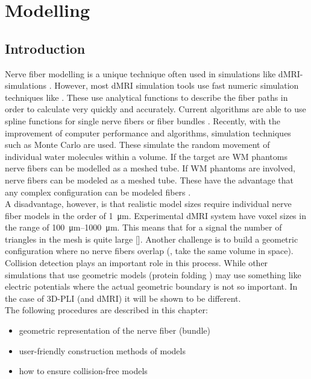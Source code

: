 \setcounter{chapter}{4}
\chapter{Modelling}
\label{chap:modelling}
% 
% 
\section{Introduction}
% 
Nerve fiber modelling is a unique technique often used in simulations like \ac{dMRI}-simulations \dummy.
However, most \ac{dMRI} simulation tools use fast numeric simulation techniques like \dummy.
These use analytical functions to describe the fiber paths in order to calculate very quickly and accurately.
Current algorithms are able to use spline functions for single nerve fibers or fiber bundles \cite{Balls2009}.
Recently, with the improvement of computer performance and algorithms, simulation techniques such as Monte Carlo \dummy are used.
These simulate the random movement of individual water molecules within a volume.
If the target are \ac{WM} phantoms nerve fibers can be modelled as a meshed tube.
If \ac{WM} phantoms are involved, nerve fibers can be modeled as a meshed tube.
These have the advantage that any complex configuration can be modeled \eg fibers \dummy.
\\
%
A disadvantage, however, is that realistic model sizes require individual nerve fiber models in the order of \SI{1}{\micro\meter}.
Experimental \ac{dMRI} system have voxel sizes in the range of \SIrange{100}{1000}{\micro\meter}.
This means that for a signal the number of triangles in the mesh is quite large [\dummy].
Another challenge is to build a geometric configuration where no nerve fibers overlap (\ie, take the same volume in space).
\\
% 
Collision detection plays an important role in this process.
While other simulations that use geometric models (\eg protein folding \dummy) may use something like electric potentials where the actual geometric boundary is not so important.
In the case of \ac{3D-PLI} (and \ac{dMRI}) it will be shown to be different.
\\[\baselineskip]
% 
The following procedures are described in this chapter:
\begin{itemize}[nosep]
    \item geometric representation of the nerve fiber (bundle)
    \item user-friendly construction methods of models
    \item how to ensure collision-free models
\end{itemize}
